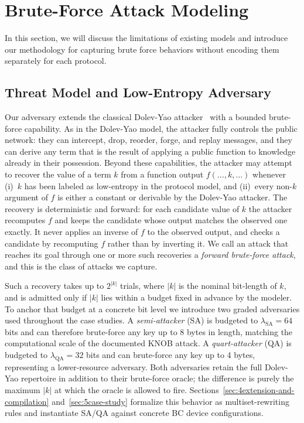\section{Brute-Force Attack Modeling} \label{sec:3symbolic-modeling}

In this section, we will discuss the limitations of existing models and introduce our methodology
for capturing brute force behaviors without encoding them separately for each protocol.

\subsection{Threat Model and Low-Entropy Adversary} \label{sec:threat-model}

Our adversary extends the classical Dolev-Yao attacker~\cite{dolev1983security}
with a bounded brute-force capability.
As in the Dolev-Yao model, the attacker fully controls the public network: they can intercept, drop, reorder, forge, and replay messages, and they can derive any term that is the result of applying a public function to knowledge already in their possession.
Beyond these capabilities, the attacker may attempt to recover the value of a term $k$ from a function output $f(\ldots, k, \ldots)$ whenever (i)~$k$ has been labeled as low-entropy in the protocol model, and (ii)~every non-$k$ argument of $f$ is either a constant or derivable by the Dolev-Yao attacker.
The recovery is deterministic and forward: for each candidate value of $k$ the attacker recomputes
$f$ and keeps the candidate whose output matches the observed one exactly.
It never applies an inverse of $f$ to the observed output, and checks a candidate by recomputing
$f$ rather than by inverting it.
We call an attack that reaches its goal through one or more such recoveries a \emph{forward
brute-force attack}, and this is the class of attacks we capture.

Such a recovery takes up to $2^{|k|}$ trials, where $|k|$ is the nominal bit-length of $k$,
and is admitted only if $|k|$ lies within a budget fixed in advance by the modeler.
To anchor that budget at a concrete bit level we introduce two graded adversaries used throughout the case studies.
A \emph{semi-attacker} (SA) is budgeted to $\lambda_{\mathrm{SA}} = 64$ bits and can therefore brute-force any key up to 8 bytes in length, matching the computational scale of the documented KNOB attack.
A \emph{quart-attacker} (QA) is budgeted to $\lambda_{\mathrm{QA}} = 32$ bits and can brute-force any key up to 4 bytes, representing a lower-resource adversary.
Both adversaries retain the full Dolev-Yao repertoire in addition to their brute-force oracle; the difference is purely the maximum $|k|$ at which the oracle is allowed to fire.
Sections~\ref{sec:4extension-and-compilation} and~\ref{sec:5case-study} formalize this behavior as multiset-rewriting rules and instantiate SA/QA against concrete BC device configurations.

